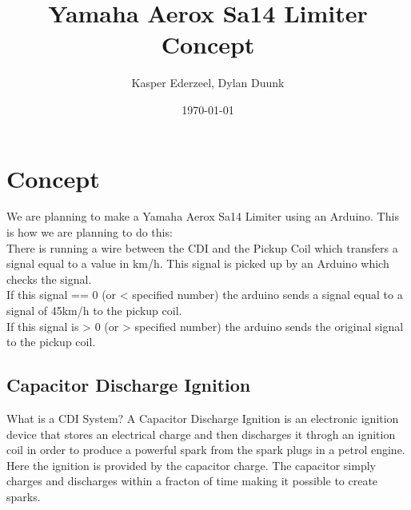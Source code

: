 \documentclass[a4paper]{article}
\begin{document}
\title{Yamaha Aerox Sa14 Limiter Concept}
\author{Kasper Ederzeel, Dylan Duunk}
\date{\today}
\maketitle

\newpage
\tableofcontents
\newpage
{}

\section{Concept}
We are planning to make a Yamaha Aerox Sa14 Limiter using an Arduino. This is how we are planning to do this: \\
There is running a wire between the CDI and the Pickup Coil which transfers a signal equal to a value in km/h. 
This signal is picked up by an Arduino which checks the signal. \\
If this signal == 0 (or < specified number) the arduino sends a signal equal to a signal of 45km/h to the pickup coil. \\
If this signal is > 0 (or > specified number) the arduino sends the original signal to the pickup coil.
\subsection{Capacitor Discharge Ignition}
What is a CDI System? A Capacitor Discharge Ignition is an
electronic ignition device that stores an electrical 
charge and then discharges it throgh an ignition coil
in order to produce a powerful spark from the spark plugs in a petrol engine.
Here the ignition is provided by the capacitor charge.
The capacitor simply charges and discharges within a fracton of time
making it possible to create sparks. 
\end{document}
